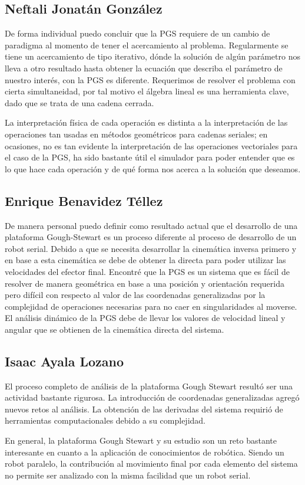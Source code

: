 

\subsection{Neftali Jonatán González}

De forma individual puedo concluir que la PGS requiere de un 
cambio de paradigma al momento de tener el acercamiento al 
problema. Regularmente se tiene un acercamiento de tipo 
iterativo, dónde la solución de algún parámetro nos lleva a 
otro resultado hasta obtener la ecuación que describa el 
parámetro de nuestro interés, con la PGS es diferente. 
Requerimos de resolver el problema con cierta simultaneidad, 
por tal motivo el álgebra lineal es una herramienta clave, 
dado que se trata de una cadena cerrada.

La interpretación física de cada operación es distinta a la 
interpretación de las operaciones tan usadas en métodos 
geométricos para cadenas seriales; en ocasiones, no es tan 
evidente la interpretación de las operaciones vectoriales  
para el caso de la PGS, ha sido bastante útil el simulador 
para poder entender que es lo que hace cada operación y de 
qué forma nos  acerca a la solución que deseamos.

\subsection{Enrique Benavidez Téllez}

De manera personal puedo definir como resultado actual que 
el desarrollo de una plataforma Gough-Stewart es un proceso 
diferente al proceso de desarrollo de un robot serial. 
Debido a que se necesita desarrollar la cinemática inversa 
primero y en base a esta cinemática se debe de obtener la 
directa para poder utilizar las velocidades del efector 
final. Encontré que la PGS es un sistema que es fácil de 
resolver de manera geométrica en base a una posición y 
orientación requerida pero difícil con respecto al valor de 
las coordenadas generalizadas por la complejidad de 
operaciones necesarias para no caer en singularidades al 
moverse. El análisis dinámico de la PGS debe de llevar los 
valores de velocidad lineal y angular que se obtienen de la 
cinemática directa del sistema. 

\subsection{Isaac Ayala Lozano}
El proceso completo de análisis de la plataforma
Gough Stewart resultó ser una actividad bastante rigurosa.
La introducción de coordenadas generalizadas agregó 
nuevos retos al análisis. La obtención de las derivadas 
del sistema requirió de herramientas computacionales
debido a su complejidad. 

En general, la plataforma Gough Stewart y su estudio 
son un reto bastante interesante en cuanto a la 
aplicación de conocimientos de robótica.
Siendo un robot paralelo, la contribución al movimiento
final por cada elemento del sistema no permite
ser analizado con la misma facilidad que un robot serial.
